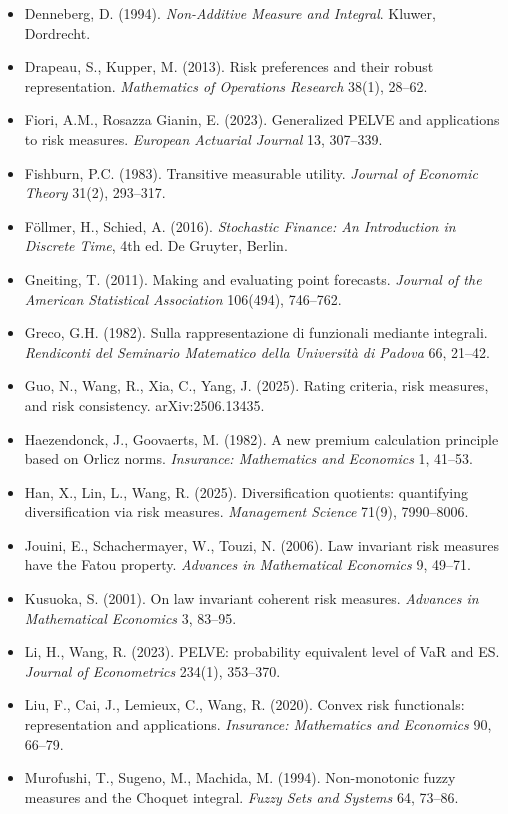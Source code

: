 \begin{itemize}
\item Denneberg, D. (1994). \emph{Non-Additive Measure and Integral}. Kluwer, Dordrecht.
\item Drapeau, S., Kupper, M. (2013). Risk preferences and their robust representation. \emph{Mathematics of Operations Research} 38(1), 28--62.
\item Fiori, A.M., Rosazza Gianin, E. (2023). Generalized PELVE and applications to risk measures. \emph{European Actuarial Journal} 13, 307--339.
\item Fishburn, P.C. (1983). Transitive measurable utility. \emph{Journal of Economic Theory} 31(2), 293--317.
\item F\"ollmer, H., Schied, A. (2016). \emph{Stochastic Finance: An Introduction in Discrete Time}, 4th ed. De Gruyter, Berlin.
\item Gneiting, T. (2011). Making and evaluating point forecasts. \emph{Journal of the American Statistical Association} 106(494), 746--762.
\item Greco, G.H. (1982). Sulla rappresentazione di funzionali mediante integrali. \emph{Rendiconti del Seminario Matematico della Universit\`a di Padova} 66, 21--42.
\item Guo, N., Wang, R., Xia, C., Yang, J. (2025). Rating criteria, risk measures, and risk consistency. arXiv:2506.13435.
\item Haezendonck, J., Goovaerts, M. (1982). A new premium calculation principle based on Orlicz norms. \emph{Insurance: Mathematics and Economics} 1, 41--53.
\item Han, X., Lin, L., Wang, R. (2025). Diversification quotients: quantifying diversification via risk measures. \emph{Management Science} 71(9), 7990--8006.
\item Jouini, E., Schachermayer, W., Touzi, N. (2006). Law invariant risk measures have the Fatou property. \emph{Advances in Mathematical Economics} 9, 49--71.
\item Kusuoka, S. (2001). On law invariant coherent risk measures. \emph{Advances in Mathematical Economics} 3, 83--95.
\item Li, H., Wang, R. (2023). PELVE: probability equivalent level of VaR and ES. \emph{Journal of Econometrics} 234(1), 353--370.
\item Liu, F., Cai, J., Lemieux, C., Wang, R. (2020). Convex risk functionals: representation and applications. \emph{Insurance: Mathematics and Economics} 90, 66--79.
\item Murofushi, T., Sugeno, M., Machida, M. (1994). Non-monotonic fuzzy measures and the Choquet integral. \emph{Fuzzy Sets and Systems} 64, 73--86.

\end{itemize}

